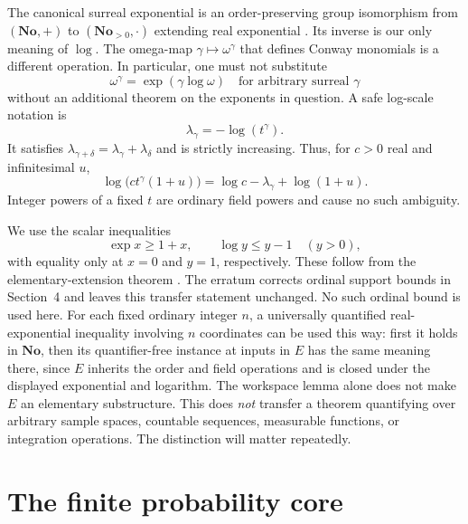 \documentclass[11pt,a4paper]{article}
\numberwithin{equation}{section}
\theoremstyle{definition}
\theoremstyle{remark}
\newcommand{\No}{\mathbf{No}}
\begin{document}
The canonical surreal exponential is an order-preserving group isomorphism
from $(\No,+)$ to $(\No_{>0},\cdot)$ extending real exponential
\cite{gonshor,vdde}. Its inverse is our only meaning of $\log$.
The omega-map $\gamma\mapsto\omega^\gamma$ that defines Conway monomials
is a different operation. In particular, one must not substitute
\begin{equation*}
 \omega^\gamma=\exp(\gamma\log\omega)
 \quad\text{for arbitrary surreal }\gamma
\end{equation*}
without an additional theorem on the exponents in question.
A safe log-scale notation is
\begin{equation}\label{fsp:eq:lambda}
 \lambda_\gamma=-\log(t^\gamma).
\end{equation}
It satisfies $\lambda_{\gamma+\delta}=\lambda_\gamma+\lambda_\delta$ and is
strictly increasing. Thus, for $c>0$ real and infinitesimal $u$,
\begin{equation}\label{fsp:eq:logleading}
 \log\bigl(c t^\gamma(1+u)\bigr)
 =\log c-\lambda_\gamma+\log(1+u).
\end{equation}
Integer powers of a fixed $t$ are ordinary field powers and cause no such
ambiguity.

We use the scalar inequalities
\begin{equation}\label{fsp:eq:logineq}
 \exp x\ge1+x,\qquad \log y\le y-1\quad(y>0),
\end{equation}
with equality only at $x=0$ and $y=1$, respectively. These follow from the
elementary-extension theorem \cite[Corollary~2.2, p.~177]{vdde}.
The erratum \cite{vddeerr} corrects ordinal support bounds in Section~4
and leaves this transfer statement unchanged. No such ordinal bound is
used here. For each fixed ordinary integer $n$, a universally quantified
real-exponential inequality involving $n$ coordinates can be used this way:
first it holds in $\No$, then its quantifier-free instance at inputs in
$E$ has the same meaning there, since $E$ inherits the order and field
operations and is closed under the displayed exponential and logarithm.
The workspace lemma alone does not make $E$ an elementary substructure. This does
\emph{not} transfer a theorem quantifying over
arbitrary sample spaces, countable sequences, measurable functions, or
integration operations. The distinction will matter repeatedly.

\section{The finite probability core}
\label{fsp:sec:finite}
\end{document}

